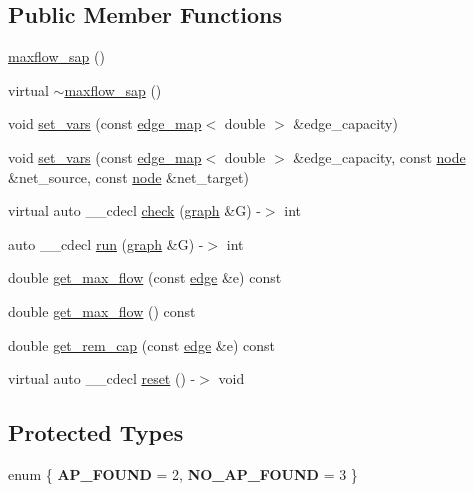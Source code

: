 \subsection*{Public Member Functions}
\begin{DoxyCompactItemize}
\item 
\mbox{\hyperlink{classmaxflow__sap_affc6e05aaa6d1b1455c99d6b5595a838}{maxflow\+\_\+sap}} ()
\item 
virtual \mbox{\hyperlink{classmaxflow__sap_ab49914afde43ffa0e5c3049cc063a8d2}{$\sim$maxflow\+\_\+sap}} ()
\item 
void \mbox{\hyperlink{classmaxflow__sap_ac50ba0330c169c7ce697947a76702e13}{set\+\_\+vars}} (const \mbox{\hyperlink{classedge__map}{edge\+\_\+map}}$<$ double $>$ \&edge\+\_\+capacity)
\item 
void \mbox{\hyperlink{classmaxflow__sap_a936f6afa25de80046c7bd69dc47fdfa9}{set\+\_\+vars}} (const \mbox{\hyperlink{classedge__map}{edge\+\_\+map}}$<$ double $>$ \&edge\+\_\+capacity, const \mbox{\hyperlink{classnode}{node}} \&net\+\_\+source, const \mbox{\hyperlink{classnode}{node}} \&net\+\_\+target)
\item 
virtual auto \+\_\+\+\_\+cdecl \mbox{\hyperlink{classmaxflow__sap_acc6035b666d6db078ef1442ac847bd74}{check}} (\mbox{\hyperlink{classgraph}{graph}} \&G) -\/$>$ int
\item 
auto \+\_\+\+\_\+cdecl \mbox{\hyperlink{classmaxflow__sap_ab46f7d6fbabeaf7b252b9f9a0e018f24}{run}} (\mbox{\hyperlink{classgraph}{graph}} \&G) -\/$>$ int
\item 
double \mbox{\hyperlink{classmaxflow__sap_ae90889b16323a2af0ab13e04c87953a5}{get\+\_\+max\+\_\+flow}} (const \mbox{\hyperlink{classedge}{edge}} \&e) const
\item 
double \mbox{\hyperlink{classmaxflow__sap_a81251d546cbdabc837f24fc3caf9fe0d}{get\+\_\+max\+\_\+flow}} () const
\item 
double \mbox{\hyperlink{classmaxflow__sap_a634835664542d5d181e1b63b99dda36c}{get\+\_\+rem\+\_\+cap}} (const \mbox{\hyperlink{classedge}{edge}} \&e) const
\item 
virtual auto \+\_\+\+\_\+cdecl \mbox{\hyperlink{classmaxflow__sap_a66cd0fdc3d4372c26c282129e9275894}{reset}} () -\/$>$ void
\end{DoxyCompactItemize}
\subsection*{Protected Types}
\begin{DoxyCompactItemize}
\item 
\mbox{\label{classmaxflow__sap_ac30ce6f46eb2dc97b557297c48989f8e}} 
enum \{ {\bfseries A\+P\+\_\+\+F\+O\+U\+ND} = 2, 
{\bfseries N\+O\+\_\+\+A\+P\+\_\+\+F\+O\+U\+ND} = 3
 \}
\end{DoxyCompactItemize}
